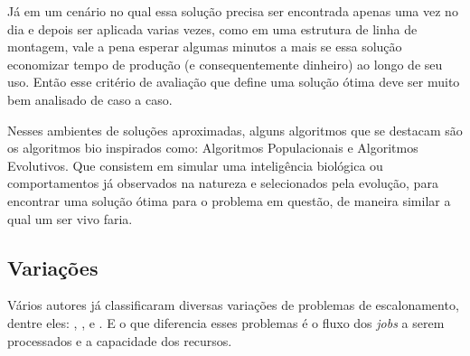         Já em um cenário no qual essa solução precisa ser encontrada apenas uma vez no dia e depois ser aplicada varias vezes, como em uma estrutura de linha de montagem, vale a pena esperar algumas minutos a mais se essa solução economizar tempo de produção (e consequentemente dinheiro) ao longo de seu uso. Então esse critério de avaliação que define uma solução ótima deve ser muito bem analisado de caso a caso.\hfill\vspace{\onelineskip}

        Nesses ambientes de soluções aproximadas, alguns algoritmos que se destacam são os algoritmos bio inspirados como: Algoritmos Populacionais e Algoritmos Evolutivos. 
        Que consistem em simular uma inteligência biológica ou comportamentos já observados na natureza e selecionados pela evolução, para encontrar uma solução ótima para o problema em questão, de maneira similar a qual um ser vivo faria.


    \subsection{Variações}
        Vários autores já classificaram diversas variações de problemas de escalonamento, dentre eles: \cite{graham1979}, \cite{Lenstra1979}, e \cite{maccarthy1993}. E o que diferencia esses problemas é o fluxo dos \textit{jobs} a serem processados e a capacidade dos recursos.\hfill\vspace{\onelineskip}
        
